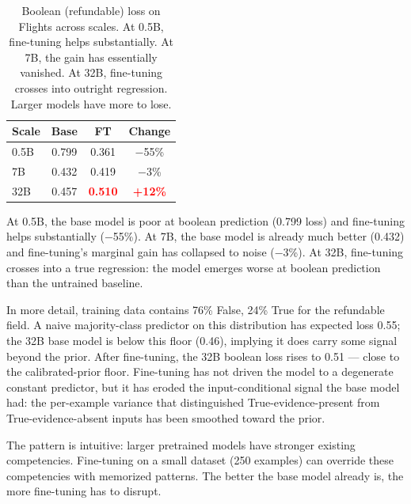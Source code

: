 \documentclass{article}
\newcommand{\regress}[1]{\textcolor{red}{\textbf{#1}}}
\begin{document}
\begin{table}[h]
\centering
\small
\begin{tabular}{lccc}
\toprule
\textbf{Scale} & \textbf{Base} & \textbf{FT} & \textbf{Change} \\
\midrule
0.5B & 0.799 & 0.361 & $-$55\% \\
7B   & 0.432 & 0.419 & $-$3\% \\
32B  & 0.457 & \regress{0.510} & \regress{+12\%} \\
\bottomrule
\end{tabular}
\caption{Boolean (refundable) loss on Flights across scales. At 0.5B, fine-tuning helps substantially. At 7B, the gain has essentially vanished. At 32B, fine-tuning crosses into outright regression. Larger models have more to lose.}
\label{tab:scaling}
\end{table}

At 0.5B, the base model is poor at boolean prediction (0.799 loss) and fine-tuning helps substantially ($-$55\%). At 7B, the base model is already much better (0.432) and fine-tuning's marginal gain has collapsed to noise ($-$3\%). At 32B, fine-tuning crosses into a true regression: the model emerges worse at boolean prediction than the untrained baseline.

In more detail, training data contains 76\% False, 24\% True for the refundable field. A naive majority-class predictor on this distribution has expected loss 0.55; the 32B base model is below this floor (0.46), implying it does carry some signal beyond the prior. After fine-tuning, the 32B boolean loss rises to 0.51 --- close to the calibrated-prior floor. Fine-tuning has not driven the model to a degenerate constant predictor, but it has eroded the input-conditional signal the base model had: the per-example variance that distinguished True-evidence-present from True-evidence-absent inputs has been smoothed toward the prior.

The pattern is intuitive: larger pretrained models have stronger existing competencies. Fine-tuning on a small dataset (250 examples) can override these competencies with memorized patterns. The better the base model already is, the more fine-tuning has to disrupt.

\end{document}

